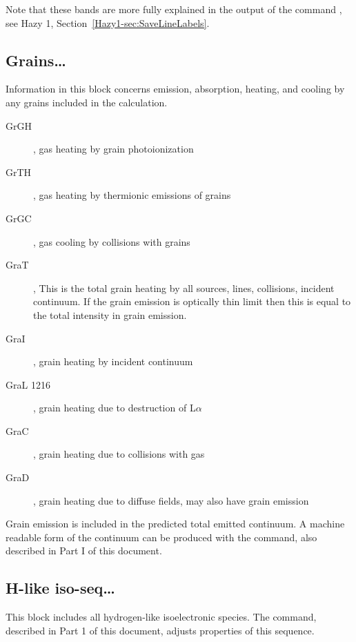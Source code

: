 Note that these bands are more fully explained in the output of the command
, see Hazy 1, Section~\ref{Hazy1-sec:SaveLineLabels}.


\subsection{Grains\dots}

Information in this block concerns emission, absorption, heating, and
cooling by any grains included in the calculation.

\begin{description}
\item[GrGH], gas heating by grain photoionization

\item[GrTH], gas heating by thermionic emissions of grains

\item[GrGC], gas cooling by collisions with grains

\item[GraT], This is the total grain heating by all sources, lines, collisions,
incident continuum.  If the grain emission is optically thin limit then
this is equal to the total intensity in grain emission.

\item[GraI], grain heating by incident continuum

\item[GraL 1216], grain heating due to destruction of L$\alpha $

\item[GraC], grain heating due to collisions with gas

\item[GraD], grain heating due to diffuse fields, may also have grain emission
\end{description}

Grain emission is included in the predicted total emitted continuum.
A machine readable form of the continuum can be produced with the  command,
also described in Part I of this document.

\subsection{H-like iso-seq\ldots}

This block includes all hydrogen-like isoelectronic species.
The  command,
described in Part 1 of this document, adjusts properties
of this sequence.

